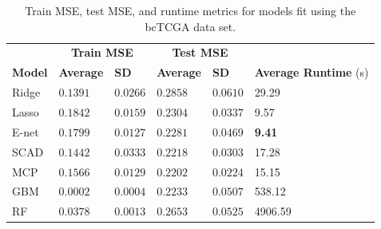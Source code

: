 \documentclass{article}
\begin{document}
	\begin{table}[h!]
		\centering
		\captionsetup{width = 5in}
		\caption{Train MSE, test MSE, and runtime metrics for models fit using the bcTCGA data set.}
		\label{tab:emp_results}
		\begin{tabular}{l|ll|ll|l}
			\hline
			& \multicolumn{2}{c|}{\textbf{Train MSE}} & \multicolumn{2}{c|}{\textbf{Test MSE}} &  \\ 
			\textbf{Model } & \textbf{Average} & \textbf{SD} & \textbf{Average} & \textbf{SD} & \textbf{Average Runtime} (s) \\ 
			\hline
			Ridge  & $0.1391$ & $0.0266$ & $0.2858$ & $0.0610$ & 29.29\\
			Lasso  & $0.1842$ & $0.0159$ & $0.2304$ & $0.0337$ & 9.57\\
			E-net  & $0.1799$ & $0.0127$ & $0.2281$ & $0.0469$ & \textbf{9.41}\\
			SCAD  & $0.1442$ & $0.0333$ & $0.2218$ & $0.0303$ & 17.28\\
			MCP  & $0.1566$ & $0.0129$ & $\mathbf{0.2202}$ & $\mathbf{0.0224}$ & 15.15\\
			GBM  & $\mathbf{0.0002}$ & $\mathbf{0.0004}$ & $0.2233$ & $0.0507$ & 538.12\\
			RF  & $0.0378$ & $0.0013$ & $0.2653$ & $0.0525$ & 4906.59\\
			\hline 
		\end{tabular}
	\end{table}
	
\end{document}
